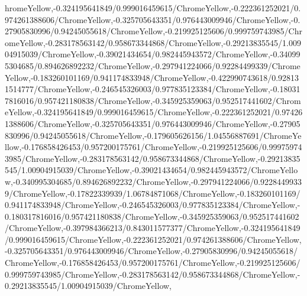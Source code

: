 {\begin{tikzternal}
{hromeYellow,-0.324195641849/0.999016459615/ChromeYellow,-0.222361252021/0.974261388606/ChromeYellow,-0.325705643351/0.976443009946/ChromeYellow,-0.27905830996/0.94245055618/ChromeYellow,-0.219925125606/0.999759743985/ChromeYellow,-0.283178563142/0.958673344868/ChromeYellow,-0.29213835545/1.00904915039/ChromeYellow,-0.39021434654/0.982445943572/ChromeYellow,-0.340995304685/0.894626892232/ChromeYellow,-0.297941224066/0.92284499339/ChromeYellow,-0.183260101169/0.941174833948/ChromeYellow,-0.422990743618/0.928131514777/ChromeYellow,-0.246545326003/0.977835123384/ChromeYellow,-0.180317816016/0.957421180838/ChromeYellow,-0.345925359063/0.952517441602/ChromeYellow,-0.324195641849/0.999016459615/ChromeYellow,-0.222361252021/0.974261388606/ChromeYellow,-0.325705643351/0.976443009946/ChromeYellow,-0.27905830996/0.94245055618/ChromeYellow,-0.179605626156/1.04556887691/ChromeYellow,-0.176858426453/0.957200175761/ChromeYellow,-0.219925125606/0.999759743985/ChromeYellow,-0.283178563142/0.958673344868/ChromeYellow,-0.29213835545/1.00904915039/ChromeYellow,-0.39021434654/0.982445943572/ChromeYellow,-0.340995304685/0.894626892232/ChromeYellow,-0.297941224066/0.92284499339/ChromeYellow,-0.17822339939/1.06784871068/ChromeYellow,-0.183260101169/0.941174833948/ChromeYellow,-0.246545326003/0.977835123384/ChromeYellow,-0.180317816016/0.957421180838/ChromeYellow,-0.345925359063/0.952517441602/ChromeYellow,-0.397984366213/0.843011577377/ChromeYellow,-0.324195641849/0.999016459615/ChromeYellow,-0.222361252021/0.974261388606/ChromeYellow,-0.325705643351/0.976443009946/ChromeYellow,-0.27905830996/0.94245055618/ChromeYellow,-0.176858426453/0.957200175761/ChromeYellow,-0.219925125606/0.999759743985/ChromeYellow,-0.283178563142/0.958673344868/ChromeYellow,-0.29213835545/1.00904915039/ChromeYellow,
}
\end{tikzternal}}
